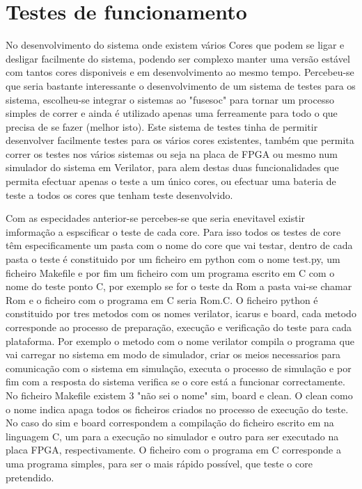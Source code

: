 
\chapter{Testes de funcionamento}
\label{chapter:teste}

No desenvolvimento do sistema onde existem vários Cores que podem se ligar e desligar facilmente do sistema, podendo ser complexo manter uma versão estável com tantos cores disponiveis e em desenvolvimento ao mesmo tempo. Percebeu-se que seria bastante interessante o desenvolvimento de um sistema de testes para os sistema, escolheu-se integrar o sistemas ao "fusesoc" para tornar um processo simples de correr e ainda é utilizado apenas uma ferreamente para todo o que precisa de se fazer (melhor isto). Este sistema de testes tinha de permitir desenvolver facilmente testes para os vários cores existentes, também que permita correr os testes nos vários sistemas ou seja na placa de FPGA ou mesmo num simulador do sistema em Verilator, para alem destas duas funcionalidades que permita efectuar apenas o teste a um único cores, ou efectuar uma bateria de teste a todos os cores que tenham teste desenvolvido.

Com as especidades anterior-se percebes-se que seria enevitavel existir imformação a espscificar o teste de cada core. Para isso todos os testes de core têm especificamente um pasta com o nome do core que vai testar, dentro de cada pasta o teste é constituido por um ficheiro em python com o nome test.py, um ficheiro Makefile e por fim um ficheiro com um programa escrito em C com o nome do teste ponto C, por exemplo se for o teste da Rom a pasta vai-se chamar Rom e o ficheiro com o programa em C seria Rom.C. O ficheiro python é constituido por tres metodos com os nomes verilator, icarus e board, cada metodo corresponde ao processo de preparação, execução e verificação do teste para cada plataforma. Por exemplo o metodo com o nome verilator compila o programa que vai carregar no sistema em modo de simulador, criar os meios necessarios para comunicação com o sistema em simulação, executa o processo de simulação e por fim com a resposta do sistema verifica se o core está a funcionar correctamente. No ficheiro Makefile existem 3 "não sei o nome" sim, board e clean. O clean como o nome indica apaga todos os ficheiros criados no processo de execução do teste. No caso do sim e board correspondem a compilação do ficheiro escrito em na linguagem C, um para a execução no simulador e outro para ser executado na placa FPGA, respectivamente. O ficheiro com o programa em C corresponde a uma programa simples, para ser o mais rápido possível, que teste o core pretendido.

